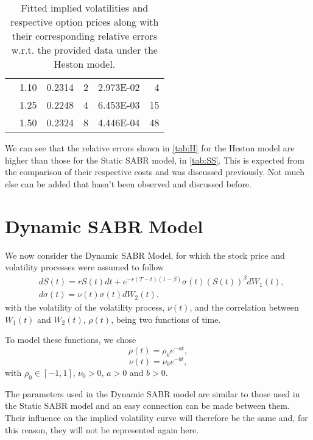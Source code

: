 \begin{table}[H]
\begin{tabular}{@{}cccrcr@{}}
 & 1.10 & 0.2314 & 2 & \num{2.973E-02} & 4 \\
 & 1.25 & 0.2248 & 4 & \num{6.453E-03} & 15 \\
 & 1.50 & 0.2324 & 8 & \num{4.446E-04} & 48 \\ \bottomrule
\end{tabular}
  \caption[Fitted implied volatilities and respective option prices along with their corresponding relative errors w.r.t. the provided data under the Heston model.]{Fitted implied volatilities and respective option prices along with their corresponding relative errors w.r.t. the provided data under the Heston model.}
  \label{tab:H}
\end{table}

We can see that the relative errors shown in \autoref{tab:H} for the Heston model are higher than those for the Static SABR model, in \autoref{tab:SS}. This is expected from the comparison of their respective costs and was discussed previously.
Not much else can be added that hasn't been observed and discussed before.




\vfill
\newpage


\section{Dynamic SABR Model}

We now consider the Dynamic SABR Model, for which the stock price and volatility processes were assumed to follow
\begin{subequations}
\begin{align}
&dS(t)=rS(t)dt+e^{-r(T-t)(1-\beta)}\sigma(t) (S(t))^\beta dW_1(t),\\
&d\sigma(t)=\nu(t)\sigma(t) dW_2(t),
\end{align}
\end{subequations}
\noindent with the volatility of the volatility process, $\nu(t)$, and the correlation between $W_1(t)$ and $W_2(t)$, $\rho(t)$, being two functions of time.

To model these functions, we chose
\begin{equation}
\rho(t)=\rho_0e^{-at},
\end{equation}
\begin{equation}
\nu(t)=\nu_0e^{-bt},
\end{equation}
\noindent with $\rho_0\in[-1,1]$, $\nu_0>0$, $a>0$ and $b>0$.


The parameters used in the Dynamic SABR model are similar to those used in the Static SABR model and an easy connection can be made between them. Their influence on the implied volatility curve will therefore be the same and, for this reason, they will not be represented again here.


